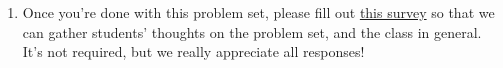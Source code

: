 \documentclass[11pt]{article}
\begin{document}
\begin{enumerate}
\textit{Note: As with the previous psets, you may include your answer in your PDF submission, but the answer should ultimately go into a separate Gradescope submission form.}

\item Once you're done with this problem set, please fill out \href{https://forms.gle/wRCLWNGWDB2KCTvC8}{this survey} so that we can gather students' thoughts on the problem set, and the class in general. It's not required, but we really appreciate all responses!

\end{enumerate}
\end{document}
